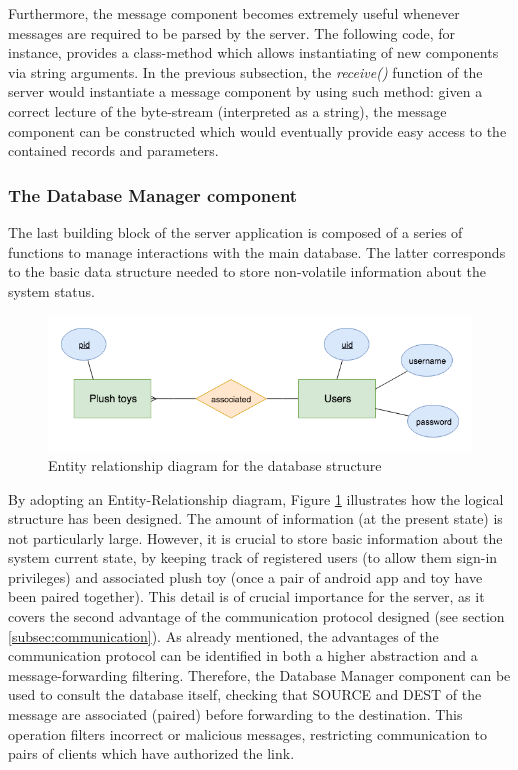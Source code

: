 \medskip
Furthermore, the message component becomes extremely useful whenever messages are required to be parsed by the server. The following code, for instance, provides a class-method which allows instantiating of new components via string arguments. In the previous subsection, the \textit{receive()} function of the server would instantiate a message component by using such method: given a correct lecture of the byte-stream (interpreted as a string), the message component can be constructed which would eventually provide easy access to the contained records and parameters.

\vspace{0.5cm}

\vspace{0.5cm}


\newpage
\subsubsection{The Database Manager component}
The last building block of the server application is composed of a series of functions to manage interactions with the main database. The latter corresponds to the basic data structure needed to store non-volatile information about the system status. 

\begin{figure}[ht]
    \centering
    \includegraphics[scale=0.7]{images/SE_ERdiag.png}
    \caption{Entity relationship diagram for the database structure}
    \label{fig:SE_ERdiag}
\end{figure}

By adopting an Entity-Relationship diagram, Figure \ref{fig:SE_ERdiag} illustrates how the logical structure has been designed. The amount of information (at the present state) is not particularly large. However, it is crucial to store basic information about the system current state, by keeping track of registered users (to allow them sign-in privileges) and associated plush toy (once a pair of android app and toy have been paired together). This detail is of crucial importance for the server, as it covers the second advantage of the communication protocol designed (see section \ref{subsec:communication}). As already mentioned, the advantages of the communication protocol can be identified in both a higher abstraction and a message-forwarding filtering. Therefore, the Database Manager component can be used to consult the database itself, checking that SOURCE and DEST of the message are associated (paired) before forwarding to the destination. This operation filters incorrect or malicious messages, restricting communication to pairs of clients which have authorized the link.

